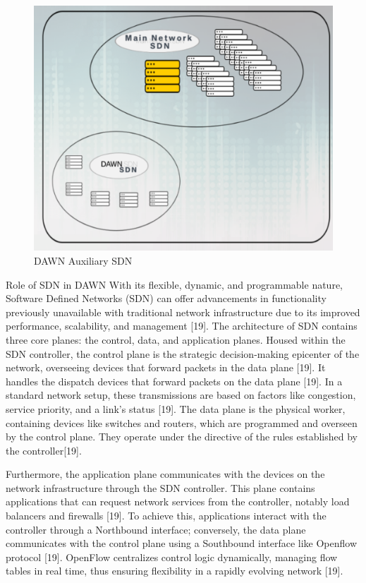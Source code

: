 \documentclass[conference]{IEEEtran}
\begin{document}
\begin{figure}[h]
\includegraphics[scale=0.32]{fig1.png}
\caption{DAWN Auxiliary SDN}
\end{figure}

Role of SDN in DAWN
With its flexible, dynamic, and programmable nature, Software Defined Networks (SDN) can offer advancements in functionality previously unavailable with traditional network infrastructure due to its improved performance, scalability, and management [19].
The architecture of SDN contains three core planes: the control, data, and application planes. Housed within the SDN controller, the control plane is the strategic decision-making epicenter of the network, overseeing devices that forward packets in the data plane [19]. It handles the dispatch devices that forward packets on the data plane [19]. In a standard network setup, these transmissions are based on factors like congestion, service priority, and a link's status [19]. The data plane is the physical worker, containing devices like switches and routers, which are programmed and overseen by the control plane. They operate under the directive of the rules established by the controller[19]. 

Furthermore, the application plane communicates with the devices on the network infrastructure through the SDN controller. This plane contains applications that can request network services from the controller, notably load balancers and firewalls [19]. To achieve this, applications interact with the controller through a Northbound interface; conversely,  the data plane communicates with the control plane using a Southbound interface like Openflow protocol [19]. OpenFlow centralizes control logic dynamically, managing flow tables in real time,  thus ensuring flexibility in a rapidly evolving network [19]. 
\end{document}
